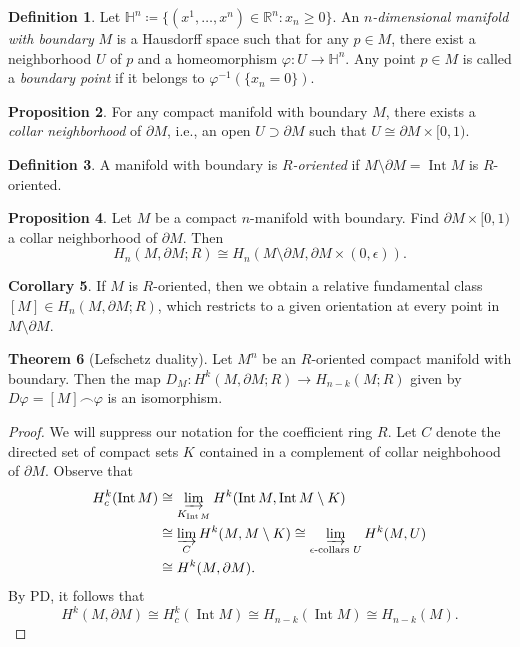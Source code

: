 \documentclass[10pt,letterpaper,cm]{nupset}
\theoremstyle{definition}
\newtheorem{definition}{Definition}[subsection]
\theoremstyle{theorem}
\newtheorem{theorem}[definition]{Theorem}
\newtheorem{prop}[definition]{Proposition}
\newtheorem{corollary}[definition]{Corollary}
\theoremstyle{remark}
\renewcommand{\H}{\mathbb H}
\newcommand{\R}{\mathbb{R}}
\newcommand{\1}{\mathbb{1}}
\newcommand{\0}{\vec 0}
\DeclareMathOperator{\Int}{Int}
\begin{document}
\begin{definition}
Let $\H^n\coloneqq  \{(x^1, \ldots, x^n) \in \R^n : x_n \geq 0\}.$ An \textit{$n$-dimensional manifold with boundary} $M$ is a Hausdorff space such that for any $p \in M$, there exist a neighborhood $U$ of $p$ and a homeomorphism $\varphi : U \to \H^n$.  Any point $p\in M$ is called a \textit{boundary point} if it belongs to $\varphi^{-1}( \{x_n = 0\})$.
\end{definition}

\begin{prop} 
For any compact manifold with boundary $M$, there exists a \textit{collar neighborhood} of $\partial{M}$, i.e., an open $U\supset \partial{M}$ such that $U \cong \partial{M} \times [0,1)$.
\end{prop}

\begin{definition}
A manifold with boundary is \textit{$R$-oriented} if $M \setminus \partial{M} = \Int{M}$ is $R$-oriented.
\end{definition}

\begin{prop} 
Let $M$ be a compact $n$-manifold with boundary. Find $ \partial{M} \times [0,1)$ a collar neighborhood of $\partial{M}$. Then $$  H_n(M, \partial{M}; R) \cong H_n(M \setminus \partial{M}, \partial{M} \times (0, \epsilon))  .$$
\end{prop}

\begin{corollary}
If $M$ is $R$-oriented, then we obtain a relative fundamental class $[M] \in H_n(M, \partial{M}; R)$, which restricts to a given orientation at every point in $M \setminus \partial{M}$.
\end{corollary}

\begin{theorem}[Lefschetz duality]
Let $M^n$ be an $R$-oriented compact manifold with boundary. Then the map $D_M: H^k(M, \partial{M}; R) \to H_{n-k}(M; R)$ given by $D{\varphi} = [M] \frown \varphi$ is an isomorphism. 
\end{theorem}
\begin{proof}
We will suppress our notation for the coefficient ring $R$. Let $C$ denote the directed set of compact sets $K$ contained in a complement of collar neighbohood of $\partial{M}$. Observe that
\begin{align*}
H^k_c(\Int{M}) & \cong \varinjlim_{K_{\Int{M}}} H^k(\Int{M}, \Int{M} \setminus K)
\\ & \cong \varinjlim_{C} H^k(M, M \setminus K) \cong \varinjlim_{\epsilon{\text{-collars }}U} H^k(M, U)
\\ & \cong H^k(M, \partial{M}). 
\end{align*}
By PD, it follows that $$H^k(M, \partial{M}) \cong H^k_c(\Int{M}) \cong H_{n-k}(\Int{M}) \cong H_{n-k}(M)  .$$
\end{proof}
\end{document}
